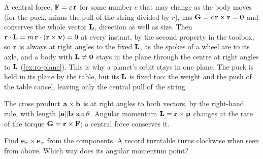 A central force, $\bm{\mathrm{F}} = c\,\bm{\mathrm{r}}$ for some number $c$ that may change
as the body moves (for the puck, minus the pull of the string divided by
$r$), has $\bm{\mathrm{G}} =
c\,\bm{\mathrm{r}}\times\bm{\mathrm{r}} = \bm{\mathrm{0}}$ and conserves the whole vector $\bm{\mathrm{L}}$,
direction as well as size. Then $\bm{\mathrm{r}}\cdot\bm{\mathrm{L}} = m\,\bm{\mathrm{r}}\cdot(\bm{\mathrm{r}}
\times\bm{\mathrm{v}}) = 0$ at every instant, by the second property in the
toolbox, so $\bm{\mathrm{r}}$ is always at right angles to the fixed $\bm{\mathrm{L}}$, as
the spokes of a wheel are to its axle, and a body with $\bm{\mathrm{L}} \neq
\bm{\mathrm{0}}$ stays in the plane through the centre at right angles to $\bm{\mathrm{L}}$
(\cref{ex:ro-plane}). This is why a planet's orbit stays in one plane.
The puck is held in its plane by the table, but its $\bm{\mathrm{L}}$ is fixed
too: the weight and the push of the table cancel, leaving only the
central pull of the string.

\begin{keyidea}
The cross product $\bm{\mathrm{a}}\times\bm{\mathrm{b}}$ is at right angles to both
vectors, by the right-hand rule, with length $\lvert\bm{\mathrm{a}}\rvert
\lvert\bm{\mathrm{b}}\rvert\sin\theta$. Angular momentum $\bm{\mathrm{L}} = \bm{\mathrm{r}}\times
\bm{\mathrm{p}}$ changes at the rate of the torque $\bm{\mathrm{G}} = \bm{\mathrm{r}}\times\bm{\mathrm{F}}$;
a central force conserves it.
\end{keyidea}

\begin{selfcheck}
Find $\bm{\mathrm{e}}_z\times\bm{\mathrm{e}}_x$ from the components. A record turntable
turns clockwise when seen from above. Which way does its angular momentum
point?
\end{selfcheck}
